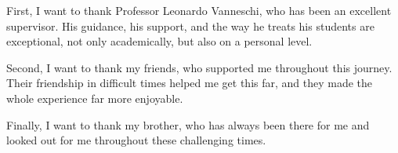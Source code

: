 
%

\begin{ntacknowledgements}

First, I want to thank Professor Leonardo Vanneschi, who has been an excellent supervisor. His guidance, his support, and the way he treats his students are exceptional, not only academically, but also on a personal level.

Second, I want to thank my friends, who supported me throughout this journey. Their friendship in difficult times helped me get this far, and they made the whole experience far more enjoyable.

Finally, I want to thank my brother, who has always been there for me and looked out for me throughout these challenging times.

\end{ntacknowledgements}